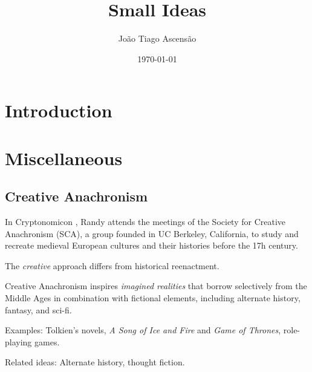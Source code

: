 \documentclass[12pt]{article}
\title{Small Ideas}
\author{João Tiago Ascensão}
\date{\today}
\begin{document}
\maketitle
\tableofcontents

\section{Introduction}
\section{Miscellaneous}
\subsection{Creative Anachronism}

In Cryptonomicon \cite{Stephenson2000}, Randy attends the meetings of the Society for Creative Anachronism (SCA), a group founded in UC Berkeley, California, to study and recreate medieval European cultures and their histories before the 17h century.

The \emph{creative} approach differs from historical reenactment.

Creative Anachronism inspires \emph{imagined realities} that borrow selectively from the Middle Ages in combination with fictional elements, including alternate history, fantasy, and sci-fi. 

Examples: Tolkien's novels, \emph{A Song of Ice and Fire} and \emph{Game of Thrones}, role-playing games.

Related ideas: Alternate history, thought fiction.



\end{document}

